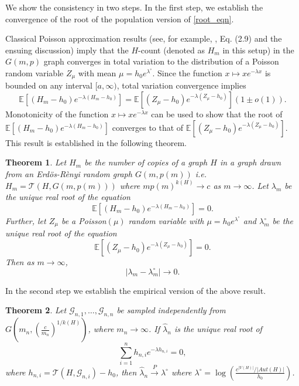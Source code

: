 \documentclass[12pt]{article}
\def\er{ Erd{\"o}s-R{\`e}nyi }
\numberwithin{equation}{section}
\newtheorem{theorem}{Theorem}[section]
\begin{document}
We show the consistency in two steps. In the first step, we establish the convergence of the root of the population version of \eqref{root_eqn}.

Classical Poisson approximation results (see, for example, \cite{barbour1982poisson}, Eq. (2.9) and the ensuing discussion) imply that the \(H\)-count (denoted as $H_m$ in this setup) in the \(G(m,p)\) graph converges in total variation to the distribution of a Poisson random variable $Z_{\mu}$ with mean \( \mu=h_0e^{\lambda^{\circ}} \). 
Since the function \(x\mapsto x e^{-\lambda x}\) is bounded on any interval \([a,\infty)\), total variation convergence implies
\begin{equation*}\mathbb{E}[(H_m-h_0)e^{-\lambda(H_m-h_0)}]=\mathbb{E}[(Z_{\mu}-h_0)e^{-\lambda(Z_{\mu}-h_0)}](1\pm o(1)).
\end{equation*}
Monotonicity of the function \(x\mapsto x e^{-\lambda x}\) can be used to show  that the root of $\mathbb{E}[(H_m-h_0)e^{-\lambda(H_m-h_0)}]$ converges to that of $\mathbb{E}[(Z_{\mu}-h_0)e^{-\lambda(Z_{\mu}-h_0)}]$. This result is established in the following theorem.

\begin{theorem}{\label{poisson_consistency_1}}
    Let $H_m$ be the number of copies of a graph $H$ in a graph drawn from an \er random graph $G(m,p(m))$ i.e. $H_m=\mathcal{T}(H,G(m,p(m)))$ where $mp(m)^{k(H)} \rightarrow c$ as $m\rightarrow \infty$. Let  $\lambda_m$ be the unique real root of the equation
    $$\mathbb{E}[(H_m-h_0)e^{-\lambda(H_m-h_0)}]=0.$$
    Further, let $Z_{\mu}$ be a Poisson$(\mu)$ random variable with $\mu=h_0e^{\lambda^{\circ}}$ and  $\lambda^{\circ}_m$ be the unique real root of the equation
    $$\mathbb{E}[(Z_{\mu}-h_0)e^{-\lambda(Z_{\mu}-h_0)}]=0.$$
 Then as $m\rightarrow\infty$,
    $$\lvert \lambda_m-\lambda^{\circ}_m\rvert\rightarrow 0.$$
\end{theorem}

In the second step we establish the empirical version of the above result.


\begin{theorem}{\label{poisson_consistency_2}}
Let $\mathcal{G}_{n,1}, \ldots, \mathcal{G}_{n,n}$ be sampled independently from $G\left(m_n, (\frac{c}{m_n})^{1/k(H)}\right)$, where \(m_n\rightarrow \infty\).
If $\hat{\lambda}_n$ is the unique real root of
\[
\sum_{i=1}^n h_{n,i} e^{-\lambda h_{n,i}} = 0,
\]
where \(h_{n,i}=\mathcal{T}(H,\mathcal{G}_{n,i})-h_0\),
then $\hat{\lambda}_n \xrightarrow{P} \lambda^{\circ}$ where $\lambda^{\circ} = \log\left(\frac{c^{|V(H)|}/\lvert Aut(H)\rvert}{h_0}\right)$.
\end{theorem}
\end{document}
